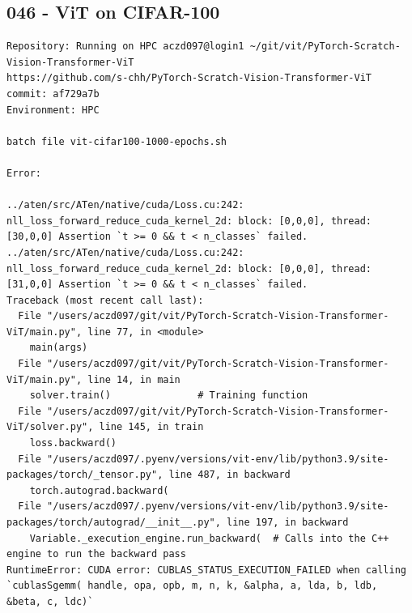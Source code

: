 \subsection{046 - ViT on CIFAR-100}
\label{app_res:046}
\begin{verbatim}
Repository: Running on HPC aczd097@login1 ~/git/vit/PyTorch-Scratch-Vision-Transformer-ViT
https://github.com/s-chh/PyTorch-Scratch-Vision-Transformer-ViT
commit: af729a7b
Environment: HPC

batch file vit-cifar100-1000-epochs.sh

Error:

../aten/src/ATen/native/cuda/Loss.cu:242: nll_loss_forward_reduce_cuda_kernel_2d: block: [0,0,0], thread: [30,0,0] Assertion `t >= 0 && t < n_classes` failed.     
../aten/src/ATen/native/cuda/Loss.cu:242: nll_loss_forward_reduce_cuda_kernel_2d: block: [0,0,0], thread: [31,0,0] Assertion `t >= 0 && t < n_classes` failed.     
Traceback (most recent call last):
  File "/users/aczd097/git/vit/PyTorch-Scratch-Vision-Transformer-ViT/main.py", line 77, in <module>
    main(args)
  File "/users/aczd097/git/vit/PyTorch-Scratch-Vision-Transformer-ViT/main.py", line 14, in main
    solver.train()               # Training function
  File "/users/aczd097/git/vit/PyTorch-Scratch-Vision-Transformer-ViT/solver.py", line 145, in train
    loss.backward()
  File "/users/aczd097/.pyenv/versions/vit-env/lib/python3.9/site-packages/torch/_tensor.py", line 487, in backward
    torch.autograd.backward(
  File "/users/aczd097/.pyenv/versions/vit-env/lib/python3.9/site-packages/torch/autograd/__init__.py", line 197, in backward
    Variable._execution_engine.run_backward(  # Calls into the C++ engine to run the backward pass
RuntimeError: CUDA error: CUBLAS_STATUS_EXECUTION_FAILED when calling `cublasSgemm( handle, opa, opb, m, n, k, &alpha, a, lda, b, ldb, &beta, c, ldc)`



\end{verbatim}

